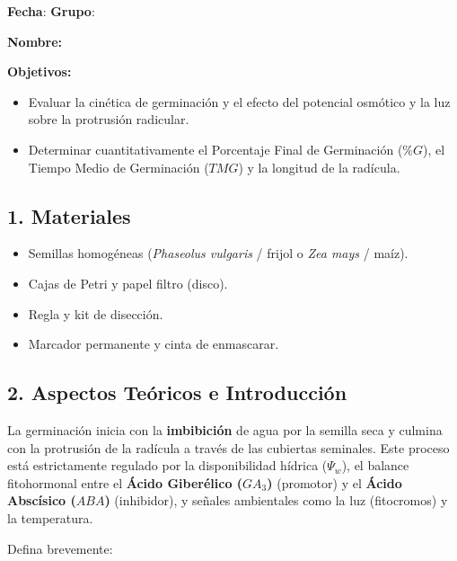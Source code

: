 \documentclass[
  spanish,
  10pt,
  letterpaper,
  twocolumn]{article}
\title{\vspace{-1.5em}{\Huge \textbf{Práctica 5 -- Fisiología de la
Germinación y Estrés Abiótico}}\vspace{-1.5em}}
\date{}
\providecommand{\tightlist}{%
  \setlength{\itemsep}{0pt}\setlength{\parskip}{0pt}}
\begin{document}
\maketitle


\textbf{Fecha}: \hrulefill \hfill \textbf{Grupo}: \hrulefill

\textbf{Nombre:} \hrulefill

\textbf{Objetivos:}

\begin{itemize}
\tightlist
\item
  Evaluar la cinética de germinación y el efecto del potencial osmótico
  y la luz sobre la protrusión radicular.
\item
  Determinar cuantitativamente el Porcentaje Final de Germinación
  (\(\%G\)), el Tiempo Medio de Germinación (\(TMG\)) y la longitud de
  la radícula.
\end{itemize}

\subsection{1. Materiales}\label{materiales}

\begin{itemize}
\tightlist
\item
  Semillas homogéneas (\emph{Phaseolus vulgaris} / frijol o \emph{Zea
  mays} / maíz).
\item
  Cajas de Petri y papel filtro (disco).
\item
  Regla y kit de disección.
\item
  Marcador permanente y cinta de enmascarar.
\end{itemize}

\subsection{2. Aspectos Teóricos e
Introducción}\label{aspectos-teuxf3ricos-e-introducciuxf3n}

La germinación inicia con la \textbf{imbibición} de agua por la semilla
seca y culmina con la protrusión de la radícula a través de las
cubiertas seminales. Este proceso está estrictamente regulado por la
disponibilidad hídrica (\(\Psi_w\)), el balance fitohormonal entre el
\textbf{Ácido Giberélico (\(GA_3\))} (promotor) y el \textbf{Ácido
Abscísico (\(ABA\))} (inhibidor), y señales ambientales como la luz
(fitocromos) y la temperatura.

Defina brevemente:
\end{document}
